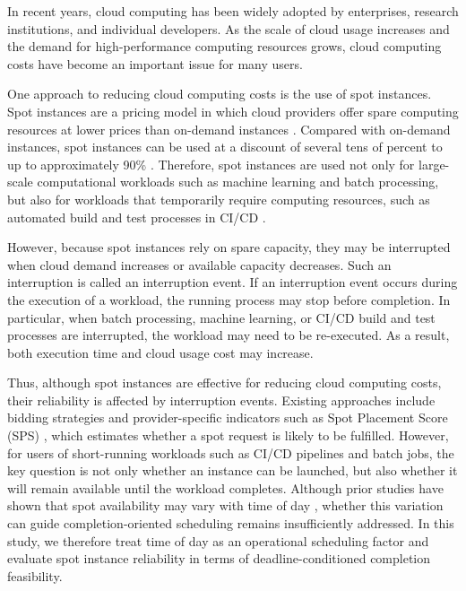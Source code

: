 \documentclass[runningheads]{llncs}
\begin{document}
In recent years, cloud computing has been widely adopted by enterprises, research institutions, and individual developers. As the scale of cloud usage increases and the demand for high-performance computing resources grows, cloud computing costs have become an important issue for many users.


One approach to reducing cloud computing costs is the use of spot instances. Spot instances are a pricing model in which cloud providers offer spare computing resources at lower prices than on-demand instances \cite{AWSSpot}. Compared with on-demand instances, spot instances can be used at a discount of several tens of percent to up to approximately 90\% \cite{Lin2022Survey}. Therefore, spot instances are used not only for large-scale computational workloads such as machine learning and batch processing, but also for workloads that temporarily require computing resources, such as automated build and test processes in CI/CD \cite{Ramesh2025}.

However, because spot instances rely on spare capacity, they may be interrupted when cloud demand increases or available capacity decreases. Such an interruption is called an interruption event. If an interruption event occurs during the execution of a workload, the running process may stop before completion. In particular, when batch processing, machine learning, or CI/CD build and test processes are interrupted, the workload may need to be re-executed. As a result, both execution time and cloud usage cost may increase.


Thus, although spot instances are effective for reducing cloud computing costs, their reliability is affected by interruption events. Existing approaches include bidding strategies and provider-specific indicators such as Spot Placement Score (SPS) \cite{Garg2025,Katayama2022}, which estimates whether a spot request is likely to be fulfilled. However, for users of short-running workloads such as CI/CD pipelines and batch jobs, the key question is not only whether an instance can be launched, but also whether it will remain available until the workload completes. Although prior studies have shown that spot availability may vary with time of day \cite{Kim2024SpotInterruption}, whether this variation can guide completion-oriented scheduling remains insufficiently addressed. In this study, we therefore treat time of day as an operational scheduling factor and evaluate spot instance reliability in terms of deadline-conditioned completion feasibility.

\end{document}
